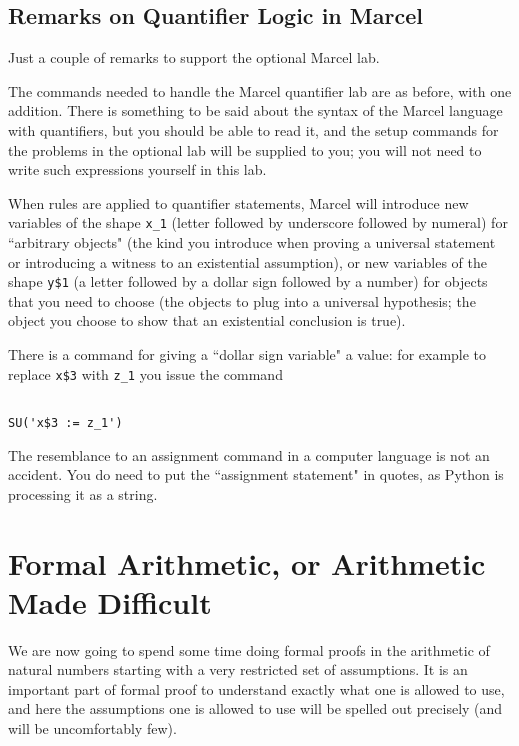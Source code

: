 \documentclass[12pt]{article}
\begin{document}
\subsection{Remarks on Quantifier Logic in Marcel}

Just a couple of remarks to support the optional Marcel lab.

The commands needed to handle the Marcel quantifier lab are as before, with one addition.  There is something to be said about the syntax of the Marcel language with quantifiers, but you should be able to read it, and the setup commands for the problems in the optional lab will be supplied to you; you will not need to write such expressions yourself in this lab.

When rules are applied to quantifier statements, Marcel will introduce new variables of the shape {\tt x\_1}  (letter followed by underscore followed by numeral) for ``arbitrary objects" (the kind you introduce when proving a universal statement or introducing a witness to an existential assumption), or new variables of the shape {\tt y\$1} (a letter followed by a dollar sign followed by a number) for objects that you need to choose (the objects to plug into a universal hypothesis;  the object you choose to show that an existential conclusion is true).

There is a command for giving a ``dollar sign variable" a value:  for example to replace {\tt x\$3} with {\tt z\_1} you issue the command

\begin{verbatim}

SU('x$3 := z_1')

\end{verbatim}

The resemblance to an assignment command in a computer language is not an accident.  You do need to put the ``assignment statement" in quotes, as Python is processing it as a string.

\section{Formal Arithmetic, or Arithmetic Made Difficult}

We are now going to spend some time doing formal proofs in the
arithmetic of natural numbers starting with a very restricted set of
assumptions.  It is an important part of formal proof to understand
exactly what one is allowed to use, and here the assumptions one is
allowed to use will be spelled out precisely (and will be
uncomfortably few).
\end{document}
